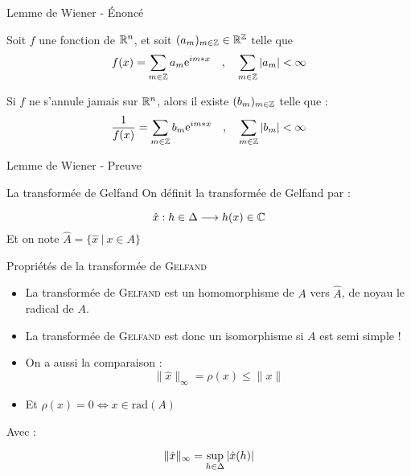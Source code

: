 \documentclass[11pt, draft]{beamer}
\begin{document}
\begin{frame}{Lemme de Wiener - Énoncé}
    \begin{myth}
        Soit $f$ une fonction de $\mathbb{R}^n$, et soit $(a_m)_{m \in \mathbb{Z}} \in \mathbb{R}^{\mathbb{Z}} $ telle que 
        \[
            f(x) = \sum_{m\in \mathbb{Z} } a_m \textrm{e}^{im*x} \quad \text{,} \quad \sum_{m \in \mathbb{Z} } | a_m | < \infty 
        \]

        Si $f$ ne s'annule jamais sur $\mathbb{R}^n$, alors il existe $(b_m)_{m \in \mathbb{Z}} $ telle que :
        \[
            \frac{1}{f(x)} = \sum_{m \in \mathbb{Z}} b_m \textrm{e}^{im*x} \quad \text{,} \quad \sum_{m \in \mathbb{Z} } | b_m | < \infty 
        \]
    \end{myth}
\end{frame}

\begin{frame}{Lemme de Wiener - Preuve}

\end{frame}

\begin{frame}{La transformée de Gelfand}
    On définit la transformée de Gelfand par :
    \begin{mydef}
        \[
            \hat{x} : h \in \Delta \longrightarrow h(x) \in \mathbb{C} 
        \]
        Et on note $\hat{A} = \{ \hat{x} \ | \ x \in A \}$
    \end{mydef}
\end{frame}

\begin{frame}
    \begin{myth}{Propriétés de la transformée de \textsc{Gelfand}}
        \begin{itemize}
            \item La transformée de \textsc{Gelfand} est un homomorphisme de $A$ vers $\hat{A}$, de noyau le radical de $A$.
            \item La transformée de \textsc{Gelfand} est donc un isomorphisme si $A$ est semi simple !
                \item On a aussi la comparaison :
                    \[
                        \| \hat{x} \|_{\infty} = \rho(x) \leq \| x \|
                    \]
                \item Et $\rho(x) = 0 \iff x \in \mathrm{rad}(A) $
        \end{itemize}
        \end{myth}

        Avec :
        \begin{mydef}
            \[
                \| \hat{x} \|_{\infty} = \sup_{h \in \Delta } | \hat{x}(h) |
            \]
        \end{mydef}
\end{frame}
\end{document}

